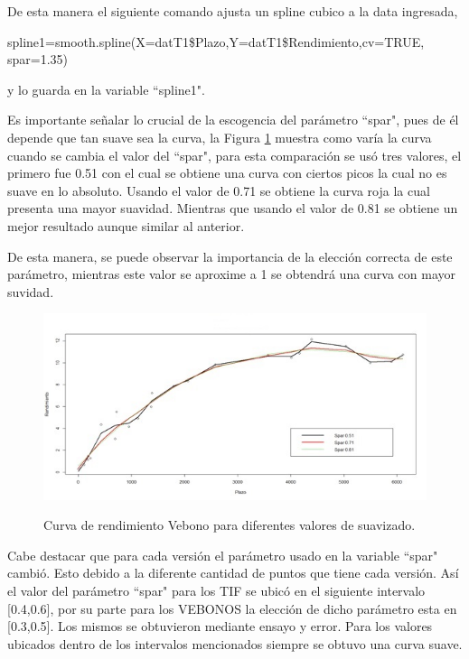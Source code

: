 \hspace{0.4cm} De esta manera el siguiente comando ajusta un spline cubico a la data ingresada,


spline1=smooth.spline(X=datT1\$Plazo,Y=datT1\$Rendimiento,cv=TRUE, spar=1.35)


\noindent y lo guarda en la variable ``spline1".

\hspace{0.4cm} Es importante se\~nalar lo crucial de la escogencia del par\'ametro ``spar", pues de \'el depende que tan suave sea la curva, la Figura \ref{comp_spar} muestra como var\'ia la curva cuando se cambia  el valor del ``spar", para esta comparaci\'on se us\'o tres valores, el primero fue 0.51 con el cual se obtiene una curva con ciertos picos la cual no es suave en lo absoluto. Usando el valor de 0.71 se obtiene la curva roja la cual presenta una mayor suavidad. Mientras que usando el valor de 0.81 se obtiene un mejor resultado aunque similar al anterior.

\hspace{0.4cm} De esta manera, se puede observar la importancia de la elecci\'on correcta de este par\'ametro, mientras este valor se aproxime a 1 se obtendr\'a una curva con mayor suvidad.

\begin{figure}[h]
  {\includegraphics{images/curvavbv2.jpg}}
\caption{Curva de rendimiento Vebono para diferentes valores de suavizado.}
\label{comp_spar}
\end{figure}

\hspace{0.4cm} Cabe destacar que para cada versi\'on el par\'ametro usado en la variable ``spar" \hspace{0.2cm} cambi\'o. Esto debido a la diferente cantidad de puntos que tiene cada versi\'on. As\'i el valor del par\'ametro ``spar" \hspace{0.2cm} para los TIF se ubic\'o en el siguiente intervalo [0.4,0.6], por su parte para los VEBONOS la elecci\'on de dicho par\'ametro esta en [0.3,0.5]. Los mismos se obtuvieron mediante ensayo y error. Para los valores ubicados dentro de los intervalos mencionados siempre se obtuvo una curva suave.

